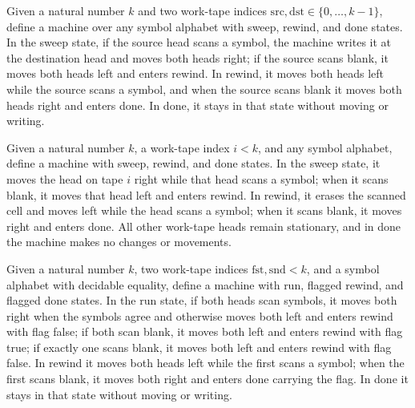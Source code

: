 \begin{definition}
\label{Turing.copyTM}
\leanok
{}
Given a natural number $k$ and two work-tape indices
$\mathrm{src},\mathrm{dst}\in\{0,\ldots,k-1\}$, define a machine over any symbol
alphabet with sweep, rewind, and done states. In the sweep state, if the source head
scans a symbol, the machine writes it at the destination head and moves both heads
right; if the source scans blank, it moves both heads left and enters rewind. In rewind,
it moves both heads left while the source scans a symbol, and when the source scans
blank it moves both heads right and enters done. In done, it stays in that state without
moving or writing.
\end{definition}

\begin{definition}
\label{Turing.clearTM}
\leanok
{}
Given a natural number $k$, a work-tape index $i<k$, and any symbol alphabet, define a
machine with sweep, rewind, and done states. In the sweep state, it moves the head on
tape $i$ right while that head scans a symbol; when it scans blank, it moves that head
left and enters rewind. In rewind, it erases the scanned cell and moves left while the
head scans a symbol; when it scans blank, it moves right and enters done. All other
work-tape heads remain stationary, and in done the machine makes no changes or
movements.
\end{definition}

\begin{definition}
\label{Turing.compareTM}
\leanok
{}
Given a natural number $k$, two work-tape indices $\mathrm{fst},\mathrm{snd}<k$, and a
symbol alphabet with decidable equality, define a machine with run, flagged rewind, and
flagged done states. In the run state, if both heads scan symbols, it moves both right
when the symbols agree and otherwise moves both left and enters rewind with flag false;
if both scan blank, it moves both left and enters rewind with flag true; if exactly one
scans blank, it moves both left and enters rewind with flag false. In rewind it moves
both heads left while the first scans a symbol; when the first scans blank, it moves
both right and enters done carrying the flag. In done it stays in that state without
moving or writing.
\end{definition}

